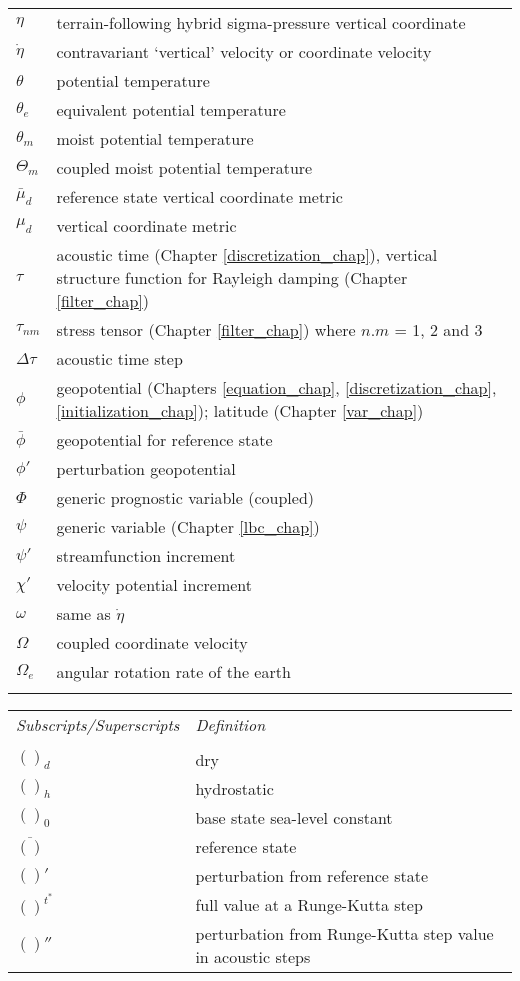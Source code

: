 \begin{tabular}{ l p{5.5in} }
$\eta$         & terrain-following hybrid sigma-pressure vertical coordinate \\
$\dot\eta$     & contravariant `vertical' velocity or coordinate velocity \\
$\theta$       & potential temperature  \\
$\theta_e$     & equivalent potential temperature  \\
$\theta_m$     & moist potential temperature  \\
$\Theta_m$       & coupled moist potential temperature  \\  
$\bar\mu_d$      & reference state vertical coordinate metric \\  
$\mu_d$        & vertical coordinate metric \\  
$\tau$         & acoustic time (Chapter \ref{discretization_chap}), vertical structure function for Rayleigh damping (Chapter \ref{filter_chap}) \\  
$\tau_{nm}$    & stress tensor (Chapter \ref{filter_chap}) where $n. m$ = 1, 2 and 3 \\  
$\Delta \tau$  & acoustic time step \\  
$\phi$         & geopotential (Chapters \ref{equation_chap}, \ref{discretization_chap}, \ref{initialization_chap}); latitude (Chapter \ref{var_chap}) \\  
$\bar \phi$    & geopotential for reference state \\  
$\phi'$        & perturbation geopotential \\  
$\Phi$         & generic prognostic variable (coupled) \\  
$\psi$         & generic variable (Chapter \ref{lbc_chap}) \\  
$\psi'$        & streamfunction increment \\  
$\chi'$        & velocity potential increment \\  
$\omega$       & same as $\dot\eta$ \\  
$\Omega$       & coupled coordinate velocity \\  
$\Omega_e$     & angular rotation rate of the earth \\  
\\
\end{tabular}

\newpage
\normalsize
\begin{tabular}{ l p{5.5in} }
{\em Subscripts/Superscripts}  & {\em Definition} \\
\\
$()_d$         & dry \\
$()_h$         & hydrostatic \\
$()_0$         & base state sea-level constant \\
$\overline{()}$ & reference state \\
$()'$          & perturbation from reference state \\
$()^{t^*}$     & full value at a Runge-Kutta step \\
$()''$         & perturbation from Runge-Kutta step value in acoustic steps \\
\end{tabular}

